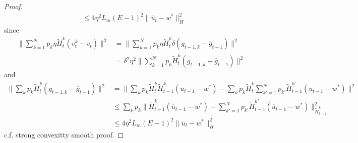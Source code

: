 \begin{proof}
\begin{align*}
		& \leq4\eta^{2}L_{m}(E-1)^{2}\|\overline{u}_{t}-w^{\ast}\|_{H}^{2}
		\end{align*}
		{} since 
		\begin{align*}
		\|\sum_{k=1}^{N}p_{k}\eta\tilde{H}_{t}^{k}(v_{t}^{k}-\overline{v}_{t})\|^{2} & =\|\sum_{k=1}^{N}p_{k}\eta\tilde{H}_{t}^{k}\delta(g_{t-1,k}-\overline{g}_{t-1})\|^{2}\\
		& =\delta^{2}\eta^{2}\|\sum_{k=1}^{N}p_{k}\tilde{H}_{t}^{k}(g_{t-1,k}-\overline{g}_{t-1})\|^{2}
		\end{align*}
		and 
		\begin{align*}
		\|\sum_{k}p_{k}\tilde{H}_{t}^{k}(g_{t-1,k}-\overline{g}_{t-1})\|^{2} & =\|\sum_{k}p_{k}\tilde{H}_{t}^{k}\tilde{H}_{t-1}^{k}(\overline{u}_{t-1}-w^{\ast})-\sum_{k}p_{k}\tilde{H}_{t}^{k}\sum_{k'=1}^{N}p_{k'}\tilde{H}_{t-1}^{k'}(\overline{u}_{t-1}-w^{\ast})\|^{2}\\
		& \leq\sum_{k}p_{k}\|\tilde{H}_{t-1}^{k}(\overline{u}_{t-1}-w^{\ast})-\sum_{k'=1}^{N}p_{k'}\tilde{H}_{t-1}^{k'}(\overline{u}_{t-1}-w^{\ast})\|_{\tilde{H}_{t-1}^{k}}^{2}\\
		& \leq4\eta^{2}L_{m}(E-1)^{2}\|\overline{u}_{t}-w^{\ast}\|_{H}^{2}
		\end{align*}
		c.f. strong convexitty smooth proof. 
		

\end{proof}
